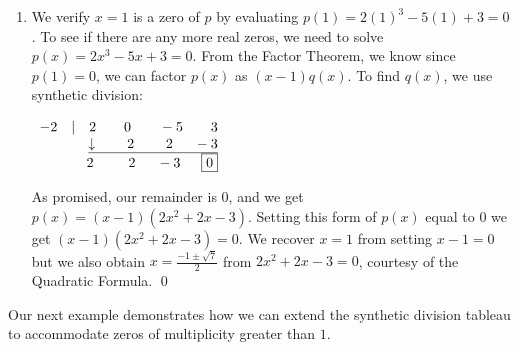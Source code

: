 \documentclass{ximera}
\begin{document}
\begin{example}
\begin{enumerate}
\item We verify $x=1$ is a zero of $p$ by evaluating $p(1) = 2(1)^3-5(1)+3 = 0$.  To see if there are any more real zeros, we need to solve $p(x) = 2x^3-5x+3 = 0$.  From the Factor Theorem, we know since $p(1) = 0$,  we can factor $p(x)$ as $(x-1)q(x)$.  To find $q(x)$, we use synthetic division:

\begin{center}
$
\begin{array}{r}
 -2 \quad |\quad 2 \quad\quad 0 \phantom{11}\quad -5 \quad\quad 3 \\
 \underline{\downarrow \quad\quad  2 \quad\quad\phantom{.} 2 \quad\phantom{1} -3}\\
2 \phantom{1}\quad\quad 2 \phantom{1}\quad -3 \phantom{1}\quad \fbox{0}
\end{array}
$    
\end{center}

As promised, our remainder is $0$, and we get  $p(x) = (x-1)\left( 2x^2 + 2x - 3\right)$.  Setting this form of $p(x)$ equal to  $0$ we get $(x-1)\left( 2x^2 + 2x - 3\right) = 0$.  We recover  $x = 1$ from setting $x-1=0$  but we also obtain $x = \frac{-1 \pm \sqrt{7}}{2}$ from  $2x^2 + 2x - 3=0$, courtesy of the Quadratic Formula.   \qed
\end{enumerate}
\end{example}

Our next example demonstrates how we can extend the synthetic division tableau to accommodate zeros of multiplicity greater than $1$.
\end{document}
